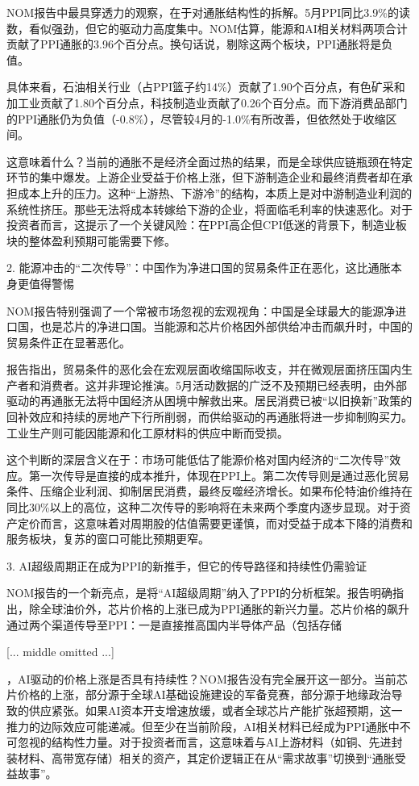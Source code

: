 \documentclass[11pt]{ctexart}
\begin{document}
NOM报告中最具穿透力的观察，在于对通胀结构性的拆解。5月PPI同比3.9\%的读数，看似强劲，但它的驱动力高度集中。NOM估算，能源和AI相关材料两项合计贡献了PPI通胀的3.96个百分点。换句话说，剔除这两个板块，PPI通胀将是负值。

具体来看，石油相关行业（占PPI篮子约14\%）贡献了1.90个百分点，有色矿采和加工业贡献了1.80个百分点，科技制造业贡献了0.26个百分点。而下游消费品部门的PPI通胀仍为负值（-0.8\%），尽管较4月的-1.0\%有所改善，但依然处于收缩区间。

这意味着什么？当前的通胀不是经济全面过热的结果，而是全球供应链瓶颈在特定环节的集中爆发。上游企业受益于价格上涨，但下游制造企业和最终消费者却在承担成本上升的压力。这种“上游热、下游冷”的结构，本质上是对中游制造业利润的系统性挤压。那些无法将成本转嫁给下游的企业，将面临毛利率的快速恶化。对于投资者而言，这提示了一个关键风险：在PPI高企但CPI低迷的背景下，制造业板块的整体盈利预期可能需要下修。

2. 能源冲击的“二次传导”：中国作为净进口国的贸易条件正在恶化，这比通胀本身更值得警惕

NOM报告特别强调了一个常被市场忽视的宏观视角：中国是全球最大的能源净进口国，也是芯片的净进口国。当能源和芯片价格因外部供给冲击而飙升时，中国的贸易条件正在显著恶化。

报告指出，贸易条件的恶化会在宏观层面收缩国际收支，并在微观层面挤压国内生产者和消费者。这并非理论推演。5月活动数据的广泛不及预期已经表明，由外部驱动的再通胀无法将中国经济从困境中解救出来。居民消费已被“以旧换新”政策的回补效应和持续的房地产下行所削弱，而供给驱动的再通胀将进一步抑制购买力。工业生产则可能因能源和化工原材料的供应中断而受损。

这个判断的深层含义在于：市场可能低估了能源价格对国内经济的“二次传导”效应。第一次传导是直接的成本推升，体现在PPI上。第二次传导则是通过恶化贸易条件、压缩企业利润、抑制居民消费，最终反噬经济增长。如果布伦特油价维持在同比30\%以上的高位，这种二次传导的影响将在未来两个季度内逐步显现。对于资产定价而言，这意味着对周期股的估值需要更谨慎，而对受益于成本下降的消费和服务板块，复苏的窗口可能比预期更窄。

3. AI超级周期正在成为PPI的新推手，但它的传导路径和持续性仍需验证

NOM报告的一个新亮点，是将“AI超级周期”纳入了PPI的分析框架。报告明确指出，除全球油价外，芯片价格的上涨已成为PPI通胀的新兴力量。芯片价格的飙升通过两个渠道传导至PPI：一是直接推高国内半导体产品（包括存储

[... middle omitted ...]

，AI驱动的价格上涨是否具有持续性？NOM报告没有完全展开这一部分。当前芯片价格的上涨，部分源于全球AI基础设施建设的军备竞赛，部分源于地缘政治导致的供应紧张。如果AI资本开支增速放缓，或者全球芯片产能扩张超预期，这一推力的边际效应可能递减。但至少在当前阶段，AI相关材料已经成为PPI通胀中不可忽视的结构性力量。对于投资者而言，这意味着与AI上游材料（如铜、先进封装材料、高带宽存储）相关的资产，其定价逻辑正在从“需求故事”切换到“通胀受益故事”。
\end{document}
